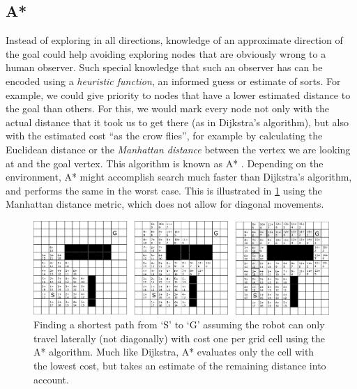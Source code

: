 \subsection{A*}\label{sec:astar}
Instead of exploring in all directions, knowledge of an approximate direction of the goal could help avoiding exploring nodes that are obviously wrong to a human observer. Such special knowledge that such an observer has can be encoded using a \textsl{heuristic function}, an informed guess or estimate of sorts. For example, we could give priority to nodes that have a lower estimated distance to the goal than others. For this, we would mark every node not only with the actual distance that it took us to get there (as in Dijkstra's algorithm), but also with the estimated cost ``as the crow flies'', for example by calculating the Euclidean distance or the \textsl{Manhattan distance} between the vertex we are looking at and the goal vertex. This algorithm is known as A* \cite{hart1968formal}. Depending on the environment, A* might accomplish search much faster than Dijkstra's algorithm, and performs the same in the worst case. This is illustrated in \cref{fig:astargrid} using the Manhattan distance metric, which does not allow for diagonal movements.


\begin{figure}[htb]
    \centering
    \includegraphics[width=\textwidth]{figs/astargrid.pdf}
    \caption{Finding a shortest path from `S' to `G' assuming the robot can only travel laterally (not diagonally) with cost one per grid cell using the A* algorithm. Much like Dijkstra, A* evaluates only the cell with the lowest cost, but takes an estimate of the remaining distance into account.\label{fig:astargrid}}
\end{figure}

